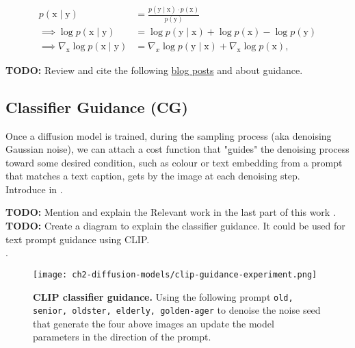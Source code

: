 \begin{equation}
    \begin{split}
        p(\mathrm{x} \mid \mathrm{y}) &= \frac{p(\mathrm{y} \mid \mathrm{x}) \cdot p(\mathrm{x})}{p(\mathrm{y})}\\
        \implies \log p(\mathrm{x} \mid \mathrm{y}) &= \log p(\mathrm{y} \mid \mathrm{x}) + \log p(\mathrm{x}) - \log p(\mathrm{y}) \\
        \implies \nabla_\mathrm{x} \log p(\mathrm{x} \mid \mathrm{y}) &= \nabla_x \log p(\mathrm{y} \mid \mathrm{x}) + \nabla_\mathrm{x} \log p(\mathrm{x}) ,
    \end{split}
\end{equation}
    
\textbf{TODO:} Review and cite the following \href{https://sander.ai/2023/08/28/geometry.html}{blog posts} \cite{dieleman2022guidance} and \cite{dieleman2023geometry} about guidance.

\subsection{Classifier Guidance (CG)}

Once a diffusion model is trained, during the sampling process (aka denoising Gaussian noise), we can attach a cost function that "guides" the denoising process toward some desired condition, such as colour or text embedding from a prompt that matches a text caption, gets by the image at each denoising step.\\ Introduce in \cite{nichol2021glide}.

\textbf{TODO:} Mention and explain the Relevant work in the last part of this work \cite{Dhariwal2021DiffusionMB}.\\     

\textbf{TODO:} Create a diagram to explain the classifier guidance. It could be used for text prompt guidance using CLIP.\\ .

\begin{figure}[ht]
    \centering
    \texttt{[image: ch2-diffusion-models/clip-guidance-experiment.png]}
    \captionsetup{width=\textwidth} %
    \caption{\textbf{CLIP classifier guidance.} Using the following prompt \texttt{old, senior, oldster, elderly, golden-ager} to denoise the noise seed that generate the four above images an update the model parameters in
    the direction of the prompt.}
    \label{fig:clip-guidance-old-experiment}
  \end{figure}


